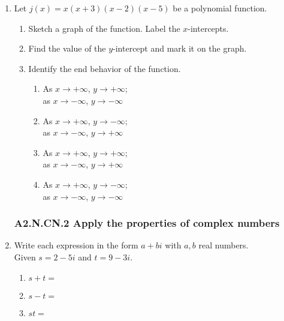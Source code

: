 \documentclass[12pt, twoside]{article}
\begin{document}
\begin{enumerate}[itemsep=0.5cm]
\item Let $j(x)= x(x+3)(x-2)(x-5)$ be a polynomial function. 
    \begin{center}
    \end{center}
    \begin{enumerate}[itemsep=0.25cm]
        \item Sketch a graph of the function. Label the $x$-intercepts.
        \item Find the value of the $y$-intercept and mark it on the graph. \vspace{1cm}
        \item Identify the end behavior of the function.
            \begin{multicols}{2}
            \begin{enumerate}
                \item As $x \to +\infty$, $y \to +\infty$; \\ 
                as $x \to -\infty$, $y \to -\infty$
                \item As $x \to +\infty$, $y \to -\infty$; \\
                as $x \to -\infty$, $y \to +\infty$
                \item As $x \to +\infty$, $y \to +\infty$; \\
                as $x \to -\infty$, $y \to +\infty$
                \item As $x \to +\infty$, $y \to -\infty$; \\
                as $x \to -\infty$, $y \to -\infty$        
            \end{enumerate}
            \end{multicols}
    \end{enumerate}

\newpage

\subsubsection*{A2.N.CN.2 Apply the properties of complex numbers}
\item Write each expression in the form $a+bi$ with $a,b$ real numbers. \\[0.25cm]
Given  $s = 2 - 5i $ and $t = 9 - 3i$.
    \begin{enumerate}[itemsep=1.5cm]
        \item $s+t =$
        \item $s-t =$
        \item $st =$
    \end{enumerate} \vspace{3cm}


\end{enumerate}
\end{document}
